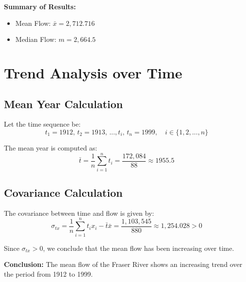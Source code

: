 \documentclass{article}
\begin{document}
\noindent \textbf{Summary of Results:}
\begin{itemize}
    \item Mean Flow: $\bar{x} = 2,712.716$
    \item Median Flow: $m = 2,664.5$
\end{itemize}

\section{Trend Analysis over Time}

\subsection{Mean Year Calculation}
Let the time sequence be:
\begin{equation}
    t_1=1912,\, t_2=1913,\,...,t_i,\,t_n=1999,\quad i \in \{1,2,...,n\}
\end{equation}

The mean year is computed as:
\begin{equation}
    \bar{t} = \frac{1}{n}\sum_{i=1}^{n}t_i = \frac{172,084}{88} \approx 1955.5
\end{equation}

\subsection{Covariance Calculation}
The covariance between time and flow is given by:
\begin{equation}
    \sigma_{tx} = \frac{1}{n}\sum_{i=1}^{n}t_i x_i - \bar{t} \bar{x} = \frac{1,103,545}{880} \approx 1,254.028 > 0
\end{equation}

Since $\sigma_{tx} > 0$, we conclude that the mean flow has been increasing over time.

\noindent \textbf{Conclusion:} The mean flow of the Fraser River shows an increasing trend over the period from 1912 to 1999.
\end{document}
